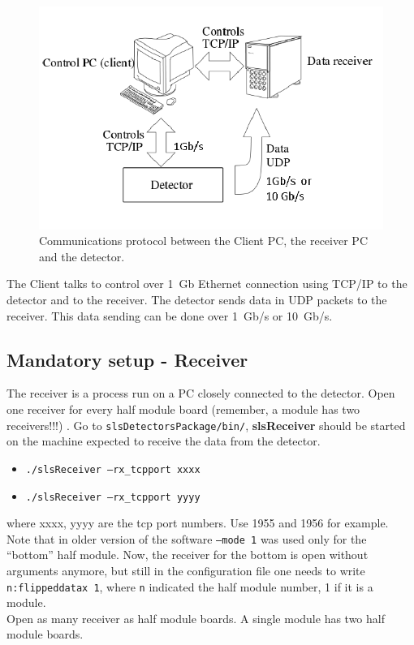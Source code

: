 \documentclass{article}
\begin{document}
\begin{figure}[t]
\begin{center}
\includegraphics[width=.8\textwidth]{Client2}
\end{center}
\caption{Communications protocol between the Client PC, the receiver PC and the detector.}
\label{fig:1}
\end{figure}

The Client talks to control over 1~Gb Ethernet connection using TCP/IP to the detector and to the receiver. The detector sends data in UDP packets to the receiver. This data sending can be done over 1~Gb/s or 10~Gb/s. 
 

\subsection{Mandatory setup - Receiver}

The receiver is a process run on a PC closely connected to the detector. Open one receiver for every half module board (remember, a module has two receivers!!!) . Go to {\tt{slsDetectorsPackage/bin/}}, \textbf{slsReceiver} should be started on the machine expected to receive the data from the detector.

\begin{itemize}
\item {\tt{./slsReceiver --rx\_tcpport xxxx}} 
\item {\tt{./slsReceiver --rx\_tcpport yyyy}}
\end{itemize}
where xxxx, yyyy are the tcp port numbers. Use 1955 and 1956 for example. Note that in older version of the software {\tt{--mode 1}} was used only for the ``bottom'' half module. Now, the receiver for the bottom is open without arguments anymore, but still in the configuration file one needs to write {\tt{n:flippeddatax 1}}, where {\tt{n}} indicated the half module number, 1 if it is a module.
\\ Open as many receiver as half module boards. A single module has two half module boards.
\end{document}
